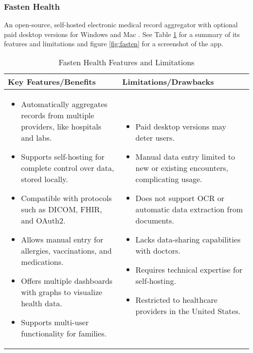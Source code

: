 \subsubsection{Fasten Health}

An open-source, self-hosted electronic medical record aggregator with optional paid desktop versions for Windows and Mac \parencite{fasten}. See Table \ref{tab:fasten_health} for a summary of its features and limitations and figure \ref{fig:fasten} for a screenshot of the app.

\begin{table}[h!]
\centering
    \begin{tabular}{|p{}|p{}|}
    \hline
    \textbf{Key Features/Benefits} & \textbf{Limitations/Drawbacks} \\ \hline
    \begin{itemize}
        \item Automatically aggregates records from multiple providers, like hospitals and labs.
        \item Supports self-hosting for complete control over data, stored locally.
        \item Compatible with protocols such as DICOM, FHIR, and OAuth2.
        \item Allows manual entry for allergies, vaccinations, and medications.
        \item Offers multiple dashboards with graphs to visualize health data.
        \item Supports multi-user functionality for families.
    \end{itemize} &
    \begin{itemize}
        \item Paid desktop versions may deter users.
        \item Manual data entry limited to new or existing encounters, complicating usage.
        \item Does not support OCR or automatic data extraction from documents.
        \item Lacks data-sharing capabilities with doctors.
        \item Requires technical expertise for self-hosting.
        \item Restricted to healthcare providers in the United States.
    \end{itemize} \\ \hline
    \end{tabular}
\caption{Fasten Health Features and Limitations}
\label{tab:fasten_health}
\end{table}
